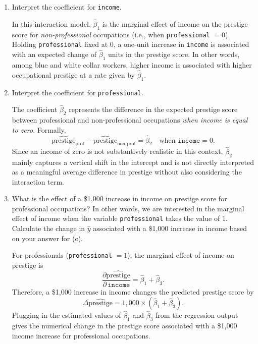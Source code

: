 \documentclass[12pt,letterpaper]{article}
\begin{document}
\begin{enumerate}
	\vspace{0.4cm}
	
	\item [(d)]
	Interpret the coefficient for \texttt{income}.
	
	\noindent
	  In this interaction model, $\hat{\beta}_1$ is the marginal effect of income on the prestige score for \emph{non-professional} occupations (i.e., when \texttt{professional} $= 0$). 
	Holding \texttt{professional} fixed at $0$, a one-unit increase in \texttt{income} is associated with an expected change of $\hat{\beta}_1$ units in the prestige score. 
	In other words, among blue and white collar workers, higher income is associated with higher occupational prestige at a rate given by $\hat{\beta}_1$.
	
	\vspace{0.4cm}
	\newpage	
	\item [(e)]
	Interpret the coefficient for \texttt{professional}.
	
	  The coefficient $\hat{\beta}_2$ represents the difference in the expected prestige score between professional and non-professional occupations \emph{when income is equal to zero}. Formally,
	\[
	\widehat{\text{prestige}}_{\text{prof}} - \widehat{\text{prestige}}_{\text{non-prof}}
	= \hat{\beta}_2 \quad \text{when } \texttt{income} = 0.
	\]
	Since an income of zero is not substantively realistic in this context, $\hat{\beta}_2$ mainly captures a vertical shift in the intercept and is not directly interpreted as a meaningful average difference in prestige without also considering the interaction term.
	
	\vspace{0.4cm}
	
	\noindent 	
	\item [(f)]
	What is the effect of a \$1,000 increase in income on prestige score for professional occupations? In other words, we are interested in the marginal effect of income when the variable \texttt{professional} takes the value of $1$. Calculate the change in $\hat{y}$ associated with a \$1,000 increase in income based on your answer for (c).
	
	\noindent
	For professionals (\texttt{professional} $=1$), the marginal effect of income on prestige is
	\[
	\frac{\partial \widehat{\text{prestige}}}{\partial\,\texttt{income}}
	= \hat{\beta}_1 + \hat{\beta}_3.
	\]
	Therefore, a \$1,000 increase in income changes the predicted prestige score by
	\[
	\Delta \widehat{\text{prestige}}
	= 1{,}000 \times (\hat{\beta}_1 + \hat{\beta}_3).
	\]
	Plugging in the estimated values of $\hat{\beta}_1$ and $\hat{\beta}_3$ from the regression output gives the numerical change in the prestige score associated with a \$1,000 income increase for professional occupations.
	\vspace{0.4cm}
	

\end{enumerate}
\end{document}
